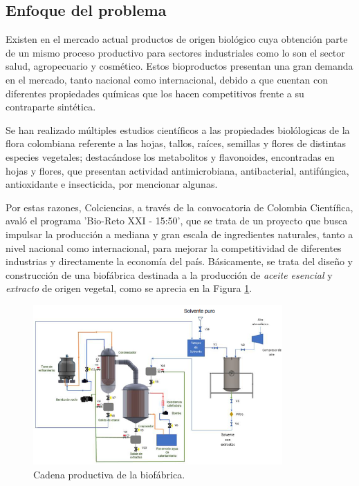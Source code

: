 \begin{center}
\section{Enfoque del problema}
\end{center}

\justify
\noindent
Existen en el mercado actual productos de origen biol\'ogico cuya obtenci\'on parte de un mismo proceso productivo para sectores industriales como lo son el sector salud, agropecuario y cosm\'etico. Estos bioproductos presentan una gran demanda en el mercado, tanto nacional como internacional, debido a que cuentan con diferentes propiedades qu\'imicas que los hacen competitivos frente a su contraparte sint\'etica.

\noindent
\justify

Se han realizado m\'ultiples estudios cient\'ificos a las propiedades biol\'ologicas de la flora colombiana referente a las hojas, tallos, ra\'ices, semillas y flores de distintas especies vegetales; destac\'andose los metabolitos y flavonoides, encontradas en hojas y flores, que presentan actividad antimicrobiana, antibacterial, antif\'ungica, antioxidante e insecticida, por mencionar algunas.

\noindent
\justify

Por estas razones, Colciencias, a trav\'es de la convocatoria de Colombia Cient\'ifica, aval\'o el programa 'Bio-Reto XXI - 15:50', que se trata de un proyecto que busca impulsar la producci\'on a mediana y gran escala de ingredientes naturales, tanto a nivel nacional como internacional, para mejorar la competitividad de diferentes industrias y directamente la econom\'ia del pa\'is. B\'asicamente, se trata del dise\~no y construcci\'on de una biof\'abrica destinada a la producci\'on de \textit{aceite esencial} y \textit{extracto} de origen vegetal, como se aprecia en la Figura \ref{cadena}. 

\noindent
\justify

\begin{figure}[h!]
	\centering
	\includegraphics[width=0.85\textwidth]{Images/planta.PNG}
	\caption{Cadena productiva de la biof\'abrica.}
	\label{cadena}
\end{figure}

